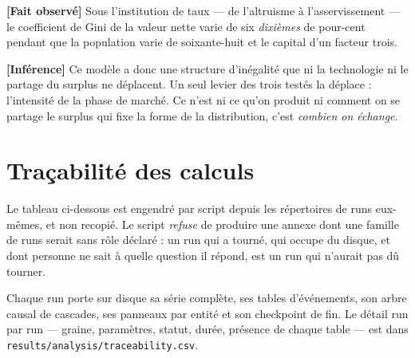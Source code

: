 \documentclass[11pt,a4paper]{article}
\newcommand{\code}[1]{\texttt{#1}}
\newcommand{\fait}{\textbf{[Fait observé]}}
\newcommand{\inference}{\textbf{[Inférence]}}
\begin{document}
\fait{} Sous l'institution de taux --- de l'altruisme à l'asservissement ---
le coefficient de Gini de la valeur nette varie de six \emph{dixièmes} de
pour-cent pendant que la population varie de soixante-huit et le capital d'un
facteur trois.

\inference{} Ce modèle a donc une structure d'inégalité que ni la technologie
ni le partage du surplus ne déplacent. Un seul levier des trois testés la
déplace : l'intensité de la phase de marché. Ce n'est ni ce qu'on produit ni
comment on se partage le surplus qui fixe la forme de la distribution, c'est
\emph{combien on échange}.

\appendix

\section{Traçabilité des calculs}

Le tableau ci-dessous est engendré par script depuis les répertoires de runs
eux-mêmes, et non recopié. Le script \emph{refuse} de produire une annexe
dont une famille de runs serait sans rôle déclaré : un run qui a tourné, qui
occupe du disque, et dont personne ne sait à quelle question il répond, est un
run qui n'aurait pas dû tourner.



Chaque run porte sur disque sa série complète, ses tables d'événements, son
arbre causal de cascades, ses panneaux par entité et son checkpoint de fin.
Le détail run par run --- graine, paramètres, statut, durée, présence de
chaque table --- est dans \code{results/analysis/traceability.csv}.
\end{document}
